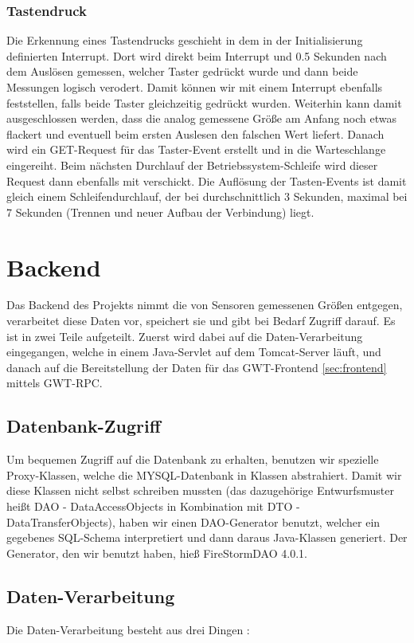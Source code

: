 \documentclass[12pt,a4paper,twoside]{article}
\begin{document}
\subsubsection{Tastendruck}
Die Erkennung eines Tastendrucks geschieht in dem in der Initialisierung definierten Interrupt. Dort wird direkt beim Interrupt und 0.5 Sekunden nach dem Auslösen gemessen, welcher Taster gedrückt wurde und dann beide Messungen logisch verodert. Damit können wir mit einem Interrupt ebenfalls feststellen, falls beide Taster gleichzeitig gedrückt wurden. Weiterhin kann damit ausgeschlossen werden, dass die analog gemessene Größe am Anfang noch etwas flackert und eventuell beim ersten Auslesen den falschen Wert liefert. Danach wird ein GET-Request für das Taster-Event erstellt und in die Warteschlange eingereiht. Beim nächsten Durchlauf der Betriebssystem-Schleife wird dieser Request dann ebenfalls mit verschickt. Die Auflösung der Tasten-Events ist damit gleich einem Schleifendurchlauf, der bei durchschnittlich 3 Sekunden, maximal bei 7 Sekunden (Trennen und neuer Aufbau der Verbindung) liegt. 

\section{Backend}\label{sec:backend}
Das Backend des Projekts nimmt die von Sensoren gemessenen Größen entgegen, verarbeitet diese Daten vor, speichert sie und gibt bei Bedarf Zugriff darauf. Es ist in zwei Teile aufgeteilt. Zuerst wird dabei auf die Daten-Verarbeitung eingegangen, welche in einem Java-Servlet auf dem Tomcat-Server läuft, und danach auf die Bereitstellung der Daten für das GWT-Frontend \ref{sec:frontend} mittels GWT-RPC.

\subsection{Datenbank-Zugriff}
Um bequemen Zugriff auf die Datenbank zu erhalten, benutzen wir spezielle Proxy-Klassen, welche die MYSQL-Datenbank in Klassen abstrahiert. Damit wir diese Klassen nicht selbst schreiben mussten (das dazugehörige Entwurfsmuster heißt DAO - DataAccessObjects in Kombination mit DTO - DataTransferObjects), haben wir einen DAO-Generator benutzt, welcher ein gegebenes SQL-Schema interpretiert und dann daraus Java-Klassen generiert. Der Generator, den wir benutzt haben, hieß FireStormDAO 4.0.1. 

\subsection{Daten-Verarbeitung}
Die Daten-Verarbeitung besteht aus drei Dingen : 
\end{document}
